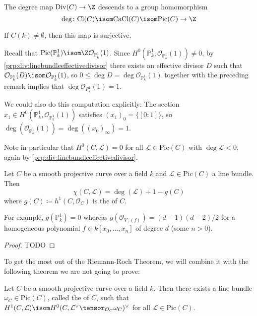 \documentclass[wip, algebra]{bsteffan-lecturenotes}
\newcommand{\cO}{\mathcal{O}}
\newcommand{\cL}{\mathcal{L}}
\renewcommand{\P}{\mathbb{P}}
\newcommand{\Pic}{\mathrm{Pic}}
\newcommand{\Div}{\mathrm{Div}}
\newcommand{\Cl}{\mathrm{Cl}}
\newcommand{\CaCl}{\mathrm{CaCl}}
\begin{document}
\begin{corollary}
	The degree map $\Div(C) \to \Z$ descends to a group homomorphism
	\begin{equation*}
		\deg\colon \Cl(C) \isom \CaCl(C) \isom \Pic(C) \to \Z
	\end{equation*}
\end{corollary}
\begin{remark}
	If $C(k) \neq \emptyset$, then this map is surjective.
\end{remark}
\begin{example}
	Recall that $\Pic(\P^1_k) \isom \Z \cO_{\P^1_k}(1)$. 
	Since $H^0(\P^1_k, \cO_{\P^1_k}(1)) \neq 0$, by \cref{prp:div:linebundleeffectivedivisor} there exists an effective divisor $D$ such that $\cO_{\P^1_k}(D) \isom \cO_{\P^1_k}(1)$, so $0 \leq \deg D = \deg \cO_{\P^1_k}(1)$ together with the preceding remark implies that $\deg \cO_{P^1_k}(1) = 1$.

	We could also do this computation explicitly:
	The section $x_1 \in H^0(\P^1_k, \cO_{\P^1_k}(1))$ satisfies $(x_1)_0 = \{[0 : 1]\}$, so $\deg(\cO_{\P^1_k}(1)) = \deg((x_0)_\infty) = 1$.
\end{example}
Note in particular that $H^0(C, \cL) = 0$ for all $\cL \in \Pic(C)$ with $\deg \cL < 0$, again by \cref{prp:div:linebundleeffectivedivisor}.
\begin{theorem}
	Let $C$ be a smooth projective curve over a field $k$ and $\cL \in \Pic(C)$ a line bundle.
	Then
	\begin{equation*}
		\chi(C, \cL) = \deg(\cL) + 1 - g(C)
	\end{equation*}
	where $g(C) \coloneq h^1(C, \cO_C)$ is the  of $C$.
\end{theorem}
For example, $g(\P^1_k) = 0$ whereas $g(\cO_{V_+(f)}) = (d - 1)(d - 2) / 2$ for a homogeneous polynomial $f \in k[x_0, \ldots, x_n]$ of degree $d$ (some $n > 0$).
\begin{proof}
	TODO
\end{proof}
To get the most out of the Riemann-Roch Theorem, we will combine it with the following theorem we are not going to prove:
\begin{theorem}
	Let $C$ be a smooth projective curve over a field $k$.
	Then there exists a line bundle $\omega_C \in \Pic(C)$, called the  of $C$, such that $H^1(C, \cL) \isom H^0(C, \cL^\vee \tensor_{\cO_C} \omega_C)^\vee$ for all $\cL \in \Pic(C)$. 
\end{theorem}
\end{document}
